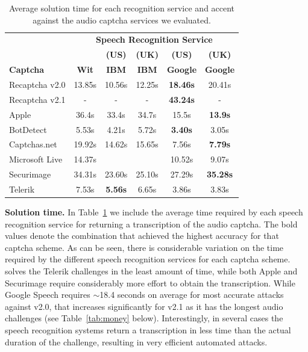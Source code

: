 \begin{table}[t]
\centering
\caption{Average solution time for each recognition service and accent against the audio captcha services we evaluated.}
\begin{tabular}{lccccc}
\toprule
&\multicolumn{5}{c}{\textbf{Speech Recognition Service}}\\
\cmidrule{2-6}
& & \textbf{(US)} & \textbf{(UK)} & \textbf{(US)} & \textbf{(UK)} \\
\textbf{Captcha}&  \textbf{Wit} & \textbf{IBM} & \textbf{IBM} & \textbf{Google} & \textbf{Google} \\
\hline
Recaptcha v2.0 & 13.85s & 10.56s  & 12.25s & \textbf{18.46s} & 20.41s \\
\rowcolor{Gray}
Recaptcha v2.1 & -  & -  & - & \textbf{43.24s} & - \\
Apple  & 36.4s & 33.4s  & 34.7s & 15.5s & \textbf{13.9s} \\
\rowcolor{Gray}
BotDetect  & 5.53s  & 4.21s & 5.72s & \textbf{3.40s} & 3.05s \\
Captchas.net  & 19.92s  & 14.62s  & 15.65s  & 7.56s & \textbf{7.79s} \\
\rowcolor{Gray}
Microsoft Live & 14.37s  &  &  & 10.52s  & 9.07s \\
Securimage  & 34.31s & 23.60s & 25.10s  & 27.29s & \textbf{35.28s} \\
\rowcolor{Gray}
Telerik  & 7.53s & \textbf{5.56s} & 6.65s & 3.86s & 3.83s \\
\bottomrule
\end{tabular}
\label{tab:solution_time}
\end{table}

\textbf{Solution time.} In Table~\ref{tab:solution_time} we include the average time required by each speech recognition 
service for returning a transcription of the audio captcha. The bold values denote the combination that achieved the highest 
accuracy for that captcha scheme. As can be seen, there is considerable variation on the time required by the different speech 
recognition services for each captcha scheme. \system solves the Telerik challenges in the least amount of time, while both
Apple and Securimage require considerably more effort to obtain the transcription. While Google Speech requires $\sim$18.4 
seconds on average for most accurate attacks against \re v2.0, that increases significantly for v2.1 as it has the longest
audio challenges (see Table~\ref{tab:money} below). Interestingly, in several cases the speech recognition systems return
a transcription in less time than the actual duration of the challenge, resulting in very efficient automated attacks.

